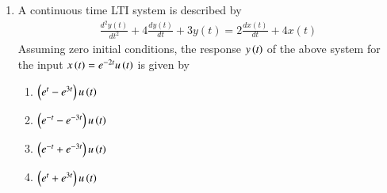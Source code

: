 \begin{enumerate}[label=\arabic*.,ref=\theenumi]
\item A continuous time LTI system is described by
\begin{align}
    \frac{d^2y(t)}{dt^2}+4\frac{dy(t)}{dt}+3y(t) = 2\frac{dx(t)}{dt}+4x(t)\label{ec/2010/41/q}
\end{align}
Assuming zero initial conditions, the response $y\left(t\right)$ of the above system for the input $x\left(t\right)=e^{-2t}u\left(t\right)$ is given by
\begin{enumerate}
    \item $\left(e^t-e^{3t}\right)u\left(t\right)$
    \item $\left(e^{-t}-e^{-3t}\right)u\left(t\right)$
    \item $\left(e^{-t}+e^{-3t}\right)u\left(t\right)$
    \item $\left(e^{t}+e^{3t}\right)u\left(t\right)$
\end{enumerate}
\solution



\end{enumerate}
